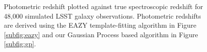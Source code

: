 \documentclass[useAMS,usenatbib,tightenlines,11pt,preprint]{aastex}
\begin{document}
\begin{figure}
\caption{
Photometric redshift plotted
against true spectroscopic redshift for 48,000 simulated LSST galaxy
observations.  Photometric redshifts are derived using the
EAZY template-fitting
algorithm in Figure \ref{subfig:eazy} and
our Gaussian Process based algorithm in Figure \ref{subfig:gp}.
}
\label{fig:scatter}
\end{figure}
\end{document}
